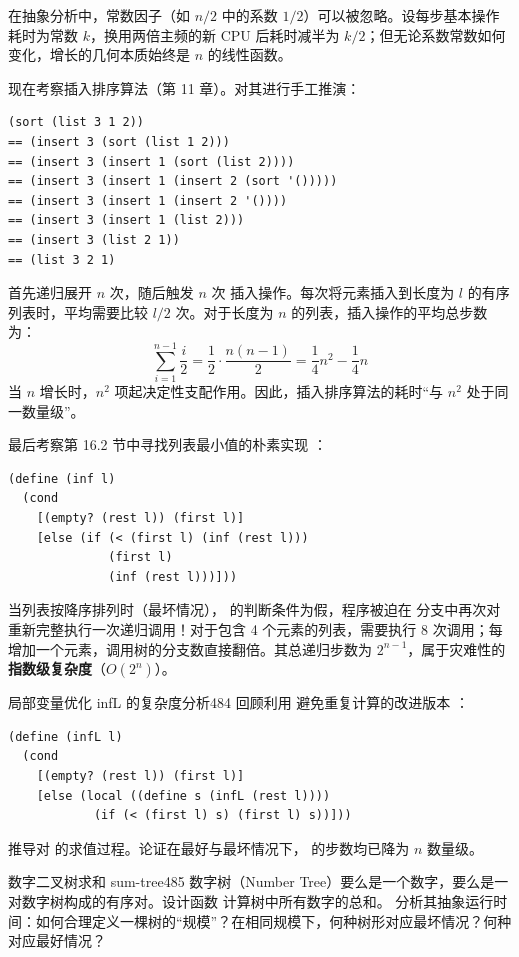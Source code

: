 在抽象分析中，常数因子（如 $n/2$ 中的系数 $1/2$）可以被忽略。设每步基本操作耗时为常数 $k$，换用两倍主频的新 CPU 后耗时减半为 $k/2$；但无论系数常数如何变化，增长的几何本质始终是 $n$ 的线性函数。

现在考察插入排序算法（第 11 章）。对其进行手工推演：
\begin{lstlisting}[language=BSL]
  (sort (list 3 1 2))
== (insert 3 (sort (list 1 2)))
== (insert 3 (insert 1 (sort (list 2))))
== (insert 3 (insert 1 (insert 2 (sort '()))))
== (insert 3 (insert 1 (insert 2 '())))
== (insert 3 (insert 1 (list 2)))
== (insert 3 (list 2 1))
== (list 3 2 1)
\end{lstlisting}

 首先递归展开 $n$ 次，随后触发 $n$ 次  插入操作。每次将元素插入到长度为 $l$ 的有序列表时，平均需要比较 $l/2$ 次。对于长度为 $n$ 的列表，插入操作的平均总步数为：
\[ \sum_{i=1}^{n-1} \frac{i}{2} = \frac{1}{2} \cdot \frac{n(n-1)}{2} = \frac{1}{4} n^2 - \frac{1}{4} n \]
当 $n$ 增长时，$n^2$ 项起决定性支配作用。因此，插入排序算法的耗时“与 $n^2$ 处于同一数量级”。

最后考察第 16.2 节中寻找列表最小值的朴素实现 ：
\begin{lstlisting}[language=BSL]
(define (inf l)
  (cond
    [(empty? (rest l)) (first l)]
    [else (if (< (first l) (inf (rest l)))
              (first l)
              (inf (rest l)))]))
\end{lstlisting}
当列表按降序排列时（最坏情况）， 的判断条件为假，程序被迫在  分支中再次对  重新完整执行一次递归调用！对于包含 4 个元素的列表，需要执行 8 次调用；每增加一个元素，调用树的分支数直接翻倍。其总递归步数为 $2^{n-1}$，属于灾难性的\textbf{指数级复杂度}（$O(2^n)$）。

\begin{exercise}{局部变量优化 infL 的复杂度分析}{484}\label{ex:484}
回顾利用  避免重复计算的改进版本 ：
\begin{lstlisting}[language=BSL]
(define (infL l)
  (cond
    [(empty? (rest l)) (first l)]
    [else (local ((define s (infL (rest l))))
            (if (< (first l) s) (first l) s))]))
\end{lstlisting}
推导对  的求值过程。论证在最好与最坏情况下， 的步数均已降为 $n$ 数量级。
\end{exercise}

\begin{exercise}{数字二叉树求和 sum-tree}{485}\label{ex:485}
数字树（Number Tree）要么是一个数字，要么是一对数字树构成的有序对。设计函数  计算树中所有数字的总和。
分析其抽象运行时间：如何合理定义一棵树的“规模”？在相同规模下，何种树形对应最坏情况？何种对应最好情况？
\end{exercise}

